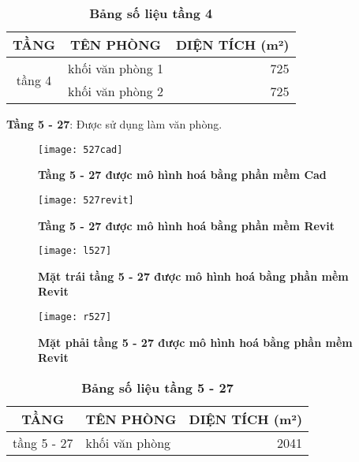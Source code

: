 \begin{table}[H]
 \centering
 \caption{\textbf{Bảng số liệu tầng 4}}
	\begin{tabular}{|c|l|r|}
		\hline
		TẦNG & \multicolumn{1}{c|}{TÊN PHÒNG} & \multicolumn{1}{c|}{DIỆN TÍCH (m²) } \bigstrut\\
		\hline
		\multirow{2}[4]{*}{tầng 4} & khối văn phòng 1 & 725 \bigstrut\\
		\cline{2-3}      & khối văn phòng 2 & 725 \bigstrut\\
		\hline
\end{tabular}%
   \label{table:bảng số liệu tầng 4}
\end{table}

\newpage
\textbf{Tầng 5 - 27}: Được sử dụng làm văn phòng.

\begin{figure}[H]
	\centering
	\texttt{[image: 527cad]}
	\caption{\textbf{Tầng 5 - 27 được mô hình hoá bằng phần mềm Cad}}
	\label{527cad}
\end{figure}

\begin{figure}[H]
	\centering
	\texttt{[image: 527revit]}
	\caption{\textbf{Tầng 5 - 27 được mô hình hoá bằng phần mềm Revit}}
	\label{527revit}
\end{figure}

\begin{figure}[H]
	\centering
	\texttt{[image: l527]}
	\caption{\textbf{Mặt trái tầng 5 - 27 được mô hình hoá bằng phần mềm Revit}}
	\label{l527}
\end{figure}

\begin{figure}[H]
	\centering
	\texttt{[image: r527]}
	\caption{\textbf{Mặt phải tầng 5 - 27 được mô hình hoá bằng phần mềm Revit}}
	\label{r527}
\end{figure}

\begin{table}[H]
	\centering
	\caption{\textbf{Bảng số liệu tầng 5 - 27}}
\begin{tabular}{|c|l|r|}
		\hline
		TẦNG & \multicolumn{1}{c|}{TÊN PHÒNG} & \multicolumn{1}{c|}{DIỆN TÍCH (m²) } \bigstrut\\
		\hline
		tầng 5 - 27 & khối văn phòng & 2041 \bigstrut\\
		\hline
\end{tabular}%
	\label{table:bảng số liệu tầng 527}
\end{table}


